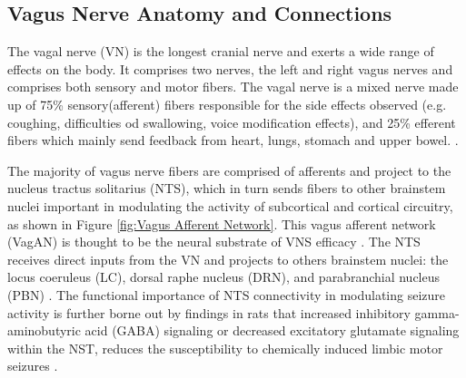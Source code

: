   \subsection*{Vagus Nerve Anatomy and Connections}
  The vagal nerve (VN) is the longest cranial nerve and exerts a wide range of effects on the body. It comprises two nerves, the left and right vagus nerves and comprises both sensory and motor fibers.
  The vagal nerve is a mixed nerve made up of 75\% sensory(afferent) fibers responsible for the side effects observed (e.g. coughing, difficulties od swallowing, voice modification effects), and 25\% efferent fibers which mainly send feedback from heart, lungs, stomach and upper bowel.  \cite{BonazSinniger2017}.

  The majority of vagus nerve fibers are comprised of afferents and project to the nucleus tractus solitarius (NTS), which in turn sends fibers to other brainstem nuclei important in modulating the activity of subcortical and cortical circuitry, as shown in Figure \ref{fig:Vagus Afferent Network}. This vagus afferent network (VagAN) is
  thought to be the neural substrate of VNS efficacy \cite{HanchemWongIbrahim2018}. 
  The NTS receives direct inputs from the VN and projects to others brainstem nuclei: the locus coeruleus (LC), dorsal raphe nucleus (DRN), and parabranchial nucleus (PBN) \cite{RICARDO19781}. The functional importance of NTS connectivity in modulating seizure activity is further borne out by findings in rats that increased inhibitory gamma-aminobutyric acid (GABA) signaling or decreased excitatory glutamate signaling within the NST, reduces the susceptibility to chemically induced limbic motor seizures \cite{GABA}.

